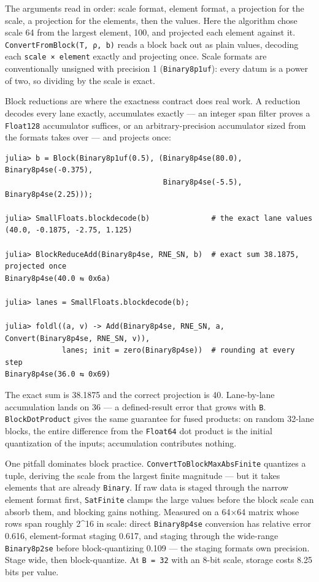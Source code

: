 The arguments read in order: scale format, element format, a projection for the scale, a projection for the elements, then the values. Here the algorithm chose scale 64 from the largest element, 100, and projected each element against it. \texttt{ConvertFromBlock(\allowbreak{}T, ρ, b)} reads a block back out as plain values, decoding each \texttt{scale × element} exactly and projecting once. Scale formats are conventionally unsigned with precision 1 (\texttt{Binary8p1uf}): every datum is a power of two, so dividing by the scale is exact.



Block reductions are where the exactness contract does real work. A reduction decodes every lane exactly, accumulates exactly — an integer span filter proves a \texttt{Float128} accumulator suffices, or an arbitrary-precision accumulator sized from the formats takes over — and projects once:




\nopagebreak[4]
\begin{verbatim}
julia> b = Block(Binary8p1uf(0.5), (Binary8p4se(80.0), Binary8p4se(-0.375),
                                    Binary8p4se(-5.5), Binary8p4se(2.25)));

julia> SmallFloats.blockdecode(b)              # the exact lane values
(40.0, -0.1875, -2.75, 1.125)

julia> BlockReduceAdd(Binary8p4se, RNE_SN, b)  # exact sum 38.1875, projected once
Binary8p4se(40.0 ⇆ 0x6a)

julia> lanes = SmallFloats.blockdecode(b);

julia> foldl((a, v) -> Add(Binary8p4se, RNE_SN, a, Convert(Binary8p4se, RNE_SN, v)),
             lanes; init = zero(Binary8p4se))  # rounding at every step
Binary8p4se(36.0 ⇆ 0x69)
\end{verbatim}



The exact sum is 38.1875 and the correct projection is 40. Lane-by-lane accumulation lands on 36 — a defined-result error that grows with \texttt{B}. \texttt{BlockDotProduct} gives the same guarantee for fused products: on random 32-lane blocks, the entire difference from the \texttt{Float64} dot product is the initial quantization of the inputs; accumulation contributes nothing.



One pitfall dominates block practice. \texttt{ConvertToBlockMaxAbsFinite} quantizes a tuple, deriving the scale from the largest finite magnitude — but it takes elements that are already \texttt{Binary}. If raw data is staged through the narrow element format first, \texttt{SatFinite} clamps the large values before the block scale can absorb them, and blocking gains nothing. Measured on a 64×64 matrix whose rows span roughly 2{\textasciicircum}16 in scale: direct \texttt{Binary8p4se} conversion has relative error 0.616, element-format staging 0.617, and staging through the wide-range \texttt{Binary8p2se} before block-quantizing 0.109 — the staging format{\textquotesingle}s own precision. Stage wide, then block-quantize. At \texttt{B = 32} with an 8-bit scale, storage costs 8.25 bits per value.



